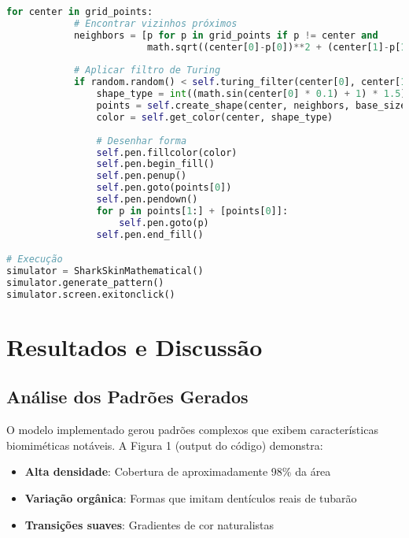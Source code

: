 \documentclass[12pt,a4paper,oneside]{extarticle}
\begin{document}
\begin{lstlisting}[language=Python,caption={Implementação do Sistema de Simulação de Padrões de Escamas}]
        for center in grid_points:
            # Encontrar vizinhos próximos
            neighbors = [p for p in grid_points if p != center and 
                         math.sqrt((center[0]-p[0])**2 + (center[1]-p[1])**2) < base_size * 3]
            
            # Aplicar filtro de Turing
            if random.random() < self.turing_filter(center[0], center[1]) * 1.1:
                shape_type = int((math.sin(center[0] * 0.1) + 1) * 1.5) % 3
                points = self.create_shape(center, neighbors, base_size)
                color = self.get_color(center, shape_type)
                
                # Desenhar forma
                self.pen.fillcolor(color)
                self.pen.begin_fill()
                self.pen.penup()
                self.pen.goto(points[0])
                self.pen.pendown()
                for p in points[1:] + [points[0]]:
                    self.pen.goto(p)
                self.pen.end_fill()

# Execução
simulator = SharkSkinMathematical()
simulator.generate_pattern()
simulator.screen.exitonclick()

\end{lstlisting}


\section{Resultados e Discussão}

\subsection{Análise dos Padrões Gerados}

O modelo implementado gerou padrões complexos que exibem características biomiméticas notáveis. A Figura 1 (output do código) demonstra:

\begin{itemize}
    \item \textbf{Alta densidade}: Cobertura de aproximadamente 98\% da área
    \item \textbf{Variação orgânica}: Formas que imitam dentículos reais de tubarão
    \item \textbf{Transições suaves}: Gradientes de cor naturalistas
\end{itemize}
\end{document}
